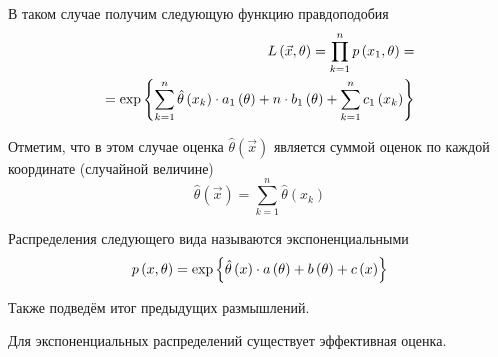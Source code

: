 В таком случае получим следующую функцию правдоподобия
\begin{align*}
    L\left( \vec{x},\theta \right)
    =\prod_{k=1}^np\left(x_1,\theta\right)=\\
    =\exp{\left\{\sum_{k=1}^n \hat{\theta}\left(x_k\right)\cdot a_1\left(\theta\right)
        +n\cdot b_1\left( \theta \right)
        +\sum_{k=1}^n c_1\left( x_k \right)\right\}}
\end{align*}

Отметим, что в этом случае оценка $\hat{\theta}\left( \vec{x} \right)$
является суммой оценок по каждой координате (случайной величине)
$$\hat{\theta}\left(\vec{x}\right)=\sum_{k=1}^n \hat{\theta}\left(x_k\right)$$

\begin{definition}
    \label{def:exponentialDistribution}
    Распределения следующего вида называются экспоненциальными
    $$p\left(x,\theta\right)
        =\exp{\left\{\hat{\theta}\left(x\right)\cdot a\left(\theta\right)
            +b\left( \theta \right)+c\left( x \right)\right\}}$$
\end{definition}

Также подведём итог предыдущих размышлений.

\begin{affirmation}
    \label{affirmation:efficientEstimator:exponentialExsistance}
    Для экспоненциальных распределений существует эффективная оценка.
\end{affirmation}

